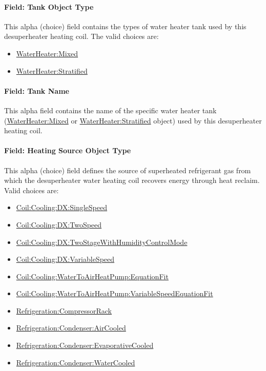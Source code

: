 \paragraph{Field: Tank Object Type}\label{field-tank-object-type}

This alpha (choice) field contains the types of water heater tank used by this desuperheater heating coil. The valid choices are:
\begin{itemize}
\item
 \hyperref[waterheatermixed]{WaterHeater:Mixed}
\item
 \hyperref[waterheaterstratified]{WaterHeater:Stratified}
\end{itemize}

\paragraph{Field: Tank Name}\label{field-tank-name}

This alpha field contains the name of the specific water heater tank (\hyperref[waterheatermixed]{WaterHeater:Mixed} or \hyperref[waterheaterstratified]{WaterHeater:Stratified} object) used by this desuperheater heating coil.

\paragraph{Field: Heating Source Object Type}\label{field-heating-source-object-type-1}

This alpha (choice) field defines the source of superheated refrigerant gas from which the desuperheater water heating coil recovers energy through heat reclaim. Valid choices are:

\begin{itemize}
\item
  \hyperref[coilcoolingdxsinglespeed]{Coil:Cooling:DX:SingleSpeed}
\item
  \hyperref[coilcoolingdxtwospeed]{Coil:Cooling:DX:TwoSpeed}
\item
  \hyperref[coilcoolingdxtwostagewithhumiditycontrolmode]{Coil:Cooling:DX:TwoStageWithHumidityControlMode}
\item
  \hyperref[coilcoolingdxvariablespeed]{Coil:Cooling:DX:VariableSpeed}
\item
  \hyperref[coilcoolingwatertoairheatpumpequationfit]{Coil:Cooling:WaterToAirHeatPump:EquationFit}
\item
  \hyperref[coilcoolingwatertoairheatpumpvariablespeedequationfit]{Coil:Cooling:WaterToAirHeatPump:VariableSpeedEquationFit}
\item
  \hyperref[refrigerationcompressorrack]{Refrigeration:CompressorRack}
\item
  \hyperref[refrigerationcondenseraircooled]{Refrigeration:Condenser:AirCooled}
\item
  \hyperref[refrigerationcondenserevaporativecooled]{Refrigeration:Condenser:EvaporativeCooled}
\item
  \hyperref[refrigerationcondenserwatercooled]{Refrigeration:Condenser:WaterCooled}
\end{itemize}

